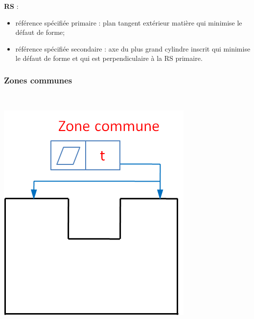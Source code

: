 \documentclass[11pt,oneside]{article}
\begin{document}
\begin{exemple}
\begin{minipage}[t]{.3\linewidth}
\textbf{RS} :
\begin{itemize}
\item référence spécifiée primaire : plan tangent extérieur matière qui minimise le défaut de forme;
\item référence spécifiée secondaire : axe du plus grand cylindre inscrit qui minimise le défaut de forme et qui est perpendiculaire à la RS primaire.
\end{itemize} 
\end{minipage} \hfill
\begin{minipage}[t]{.3\linewidth}
\begin{center}
\end{center}
\end{minipage} 
\end{exemple}


\subsubsection{Zones communes}

\begin{exemple}
\begin{minipage}[t]{.3\linewidth}
\begin{center}
$\;$

\includegraphics[width=.95\textwidth]{png/ex_zc}
\end{center}
\end{minipage} \hfill
\begin{minipage}[t]{.6\linewidth}

\end{minipage}
\end{exemple}
\end{document}
